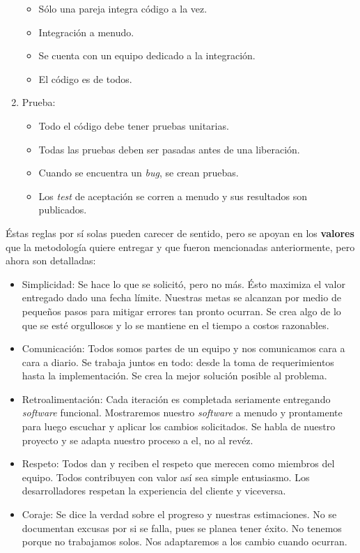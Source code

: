 \begin{enumerate}
\begin{itemize}
	\item Sólo una pareja integra código a la vez.
	\item Integración a menudo.
	\item Se cuenta con un equipo dedicado a la integración.
	\item El código es de todos.
	\end{itemize}
\item Prueba:
	\begin{itemize}
	\item Todo el código debe tener pruebas unitarias.
	\item Todas las pruebas deben ser pasadas antes de una liberación.
	\item Cuando se encuentra un \textit{bug}, se crean pruebas.
	\item Los \textit{test} de aceptación se corren a menudo y sus resultados son publicados.
	\end{itemize}
\end{enumerate}

Éstas reglas por sí solas pueden carecer de sentido, pero se apoyan en los \textbf{valores} que la metodología quiere entregar y que fueron mencionadas anteriormente, pero ahora son detalladas:

\begin{itemize}
\item Simplicidad: Se hace lo que se solicitó, pero no más. Ésto maximiza el valor entregado dado una fecha límite. Nuestras metas se alcanzan por medio de pequeños pasos para mitigar errores tan pronto ocurran. Se crea algo de lo que se esté orgullosos y lo se mantiene en el tiempo a costos razonables.
\item Comunicación: Todos somos partes de un equipo y nos comunicamos cara a cara a diario. Se trabaja juntos en todo: desde la toma de requerimientos hasta la implementación. Se crea la mejor solución posible al problema.
\item Retroalimentación: Cada iteración es completada seriamente entregando \textit{software} funcional. Mostraremos nuestro \textit{software} a menudo y prontamente para luego escuchar y aplicar los cambios solicitados. Se habla de nuestro proyecto y se adapta nuestro proceso a el, no al revéz.
\item Respeto: Todos dan y reciben el respeto que merecen como miembros del equipo. Todos contribuyen con valor así sea simple entusiasmo. Los desarrolladores respetan la experiencia del cliente y viceversa. 
\item Coraje: Se dice la verdad sobre el progreso y nuestras estimaciones. No se documentan excusas por si se falla, pues se planea tener éxito. No tenemos porque no trabajamos solos. Nos adaptaremos a los cambio cuando ocurran.
\end{itemize}

